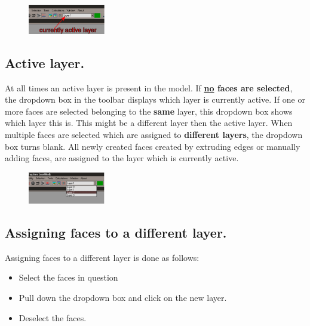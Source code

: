 \documentclass[12pt]{article}
\begin{document}
\begin{figure}
        \centering
        \includegraphics[width=0.3\textwidth,natwidth=399,natheight=153]{activelayer.png}
        \caption{}
        \label{fig:activelayer}
\end{figure}

\subsection{Active layer.}
At all times an active layer is present in the
model. If \textbf{\underline{no} faces are selected}, the dropdown box
in the toolbar displays which layer is currently active. If one or
more faces are selected belonging to the
\textbf{same} layer, this dropdown box shows which layer this is. This might be
a different layer then the active layer. When multiple faces are
selected which are assigned to \textbf{different layers}, the dropdown
box turns blank. All newly created faces created by extruding edges or
manually adding faces, are assigned to the layer which is currently
active.

\begin{figure}
        \centering
        \includegraphics[width=0.3\textwidth,natwidth=408,natheight=168]{assignlayer.png}
        \caption{}
        \label{fig:assignlayer}
\end{figure}

\subsection{Assigning faces to a different layer.}
Assigning faces to a different layer is done as follows:

\begin{itemize}

  \item Select the faces in question
  \item Pull down the dropdown box and click on the new
layer.

  \item Deselect the faces.

\end{itemize}
\end{document}
